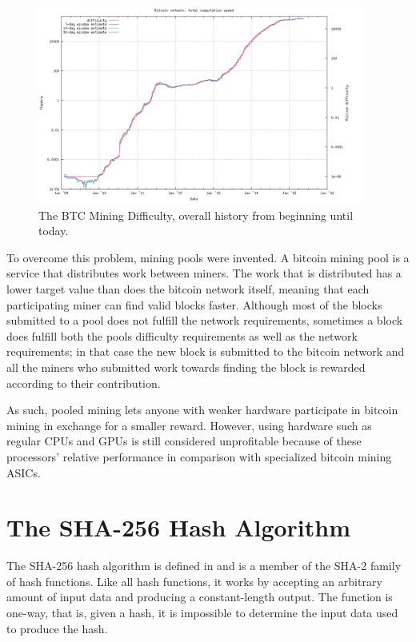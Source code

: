 \begin{figure}[htb]
    \centering
    \includegraphics[width=0.95\textwidth]{Figures/Bitcoin/Difficulty-all}
    \caption{The BTC Mining Difficulty, overall history from beginning until today.}
    \label{fig:difficulty}
\end{figure}

To overcome this problem, mining pools were invented. A bitcoin mining pool is a service that distributes
work between miners. The work that is distributed has a lower target value than does the bitcoin network
itself, meaning that each participating miner can find valid blocks faster. Although most of the blocks
submitted to a pool does not fulfill the network requirements, sometimes a block does fulfill both the
pools difficulty requirements as well as the network requirements; in that case the new block is
submitted to the bitcoin network and all the miners who submitted work towards finding the block
is rewarded according to their contribution.

As such, pooled mining lets anyone with weaker hardware participate in bitcoin mining in exchange for
a smaller reward. However, using hardware such as regular CPUs and GPUs is still considered unprofitable
because of these processors' relative performance in comparison with specialized bitcoin mining ASICs.

\section{The SHA-256 Hash Algorithm}

The SHA-256 hash algorithm is defined in \cite{fips180-4} and is a member of the SHA-2
family of hash functions. Like all hash functions, it works by accepting an arbitrary
amount of input data and producing a constant-length output. The function is one-way,
that is, given a hash, it is impossible to determine the input data used to produce
the hash.

